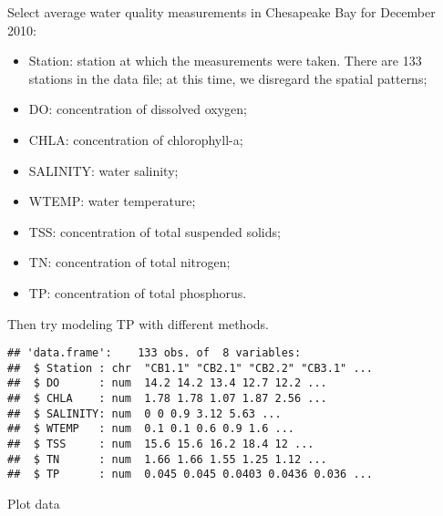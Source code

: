 \documentclass[
]{book}
\newenvironment{Shaded}{\begin{snugshade}}{\end{snugshade}}
\newcommand{\DecValTok}[1]{\textcolor[rgb]{0.00,0.00,0.81}{#1}}
\newcommand{\KeywordTok}[1]{\textcolor[rgb]{0.13,0.29,0.53}{\textbf{#1}}}
\newcommand{\NormalTok}[1]{#1}
\newcommand{\OperatorTok}[1]{\textcolor[rgb]{0.81,0.36,0.00}{\textbf{#1}}}
\newcommand{\StringTok}[1]{\textcolor[rgb]{0.31,0.60,0.02}{#1}}
\providecommand{\tightlist}{%
  \setlength{\itemsep}{0pt}\setlength{\parskip}{0pt}}
\begin{document}
Select average water quality measurements in Chesapeake Bay for December 2010:

\begin{itemize}
\tightlist
\item
  Station: station at which the measurements were taken. There are 133 stations in the data file; at this time, we disregard the spatial patterns;
\item
  DO: concentration of dissolved oxygen;
\item
  CHLA: concentration of chlorophyll-a;
\item
  SALINITY: water salinity;
\item
  WTEMP: water temperature;
\item
  TSS: concentration of total suspended solids;
\item
  TN: concentration of total nitrogen;
\item
  TP: concentration of total phosphorus.
\end{itemize}

Then try modeling TP with different methods.

\begin{Shaded}
\end{Shaded}

\begin{verbatim}
## 'data.frame':    133 obs. of  8 variables:
##  $ Station : chr  "CB1.1" "CB2.1" "CB2.2" "CB3.1" ...
##  $ DO      : num  14.2 14.2 13.4 12.7 12.2 ...
##  $ CHLA    : num  1.78 1.78 1.07 1.87 2.56 ...
##  $ SALINITY: num  0 0 0.9 3.12 5.63 ...
##  $ WTEMP   : num  0.1 0.1 0.6 0.9 1.6 ...
##  $ TSS     : num  15.6 15.6 16.2 18.4 12 ...
##  $ TN      : num  1.66 1.66 1.55 1.25 1.12 ...
##  $ TP      : num  0.045 0.045 0.0403 0.0436 0.036 ...
\end{verbatim}

Plot data
\end{document}
